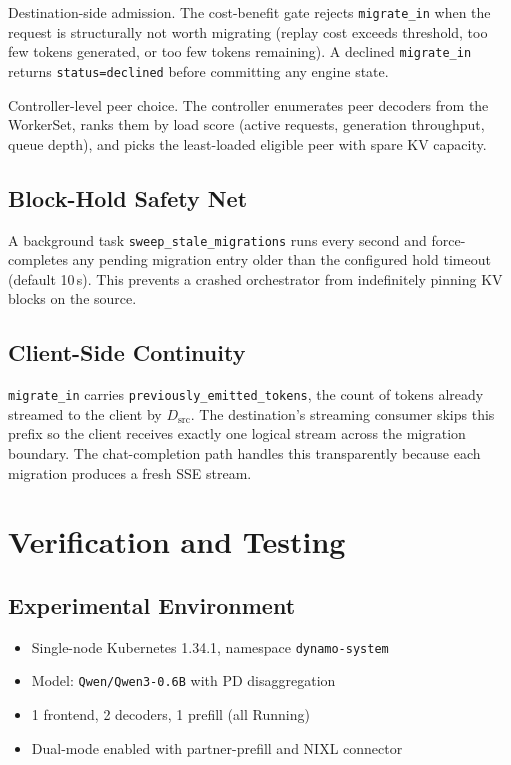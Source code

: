 \documentclass[10pt,twocolumn,letterpaper]{article}
\begin{document}
Destination-side admission. The cost-benefit gate rejects \texttt{migrate\_in} when the request is structurally not worth migrating (replay cost exceeds threshold, too few tokens generated, or too few tokens remaining). A declined \texttt{migrate\_in} returns \texttt{status=declined} before committing any engine state.

Controller-level peer choice. The controller enumerates peer decoders from the WorkerSet, ranks them by load score (active requests, generation throughput, queue depth), and picks the least-loaded eligible peer with spare KV capacity.

\subsection{Block-Hold Safety Net}
\label{sec:safety-net}

A background task \texttt{sweep\_stale\_migrations} runs every second and force-completes any pending migration entry older than the configured hold timeout (default 10\,s). This prevents a crashed orchestrator from indefinitely pinning KV blocks on the source.

\subsection{Client-Side Continuity}
\label{sec:client-continuity}

\texttt{migrate\_in} carries \texttt{previously\_emitted\_tokens}, the count of tokens already streamed to the client by $D_{\text{src}}$. The destination's streaming consumer skips this prefix so the client receives exactly one logical stream across the migration boundary. The chat-completion path handles this transparently because each migration produces a fresh SSE stream.

\section{Verification and Testing}
\label{sec:validation}

\subsection{Experimental Environment}
\label{sec:env}

\begin{itemize}[nosep]
\item Single-node Kubernetes 1.34.1, namespace \texttt{dynamo-system}
\item Model: \texttt{Qwen/Qwen3-0.6B} with PD disaggregation
\item 1 frontend, 2 decoders, 1 prefill (all Running)
\item Dual-mode enabled with partner-prefill and NIXL connector
\end{itemize}
\end{document}
